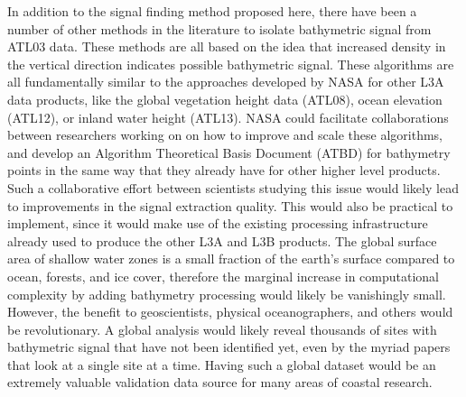 In addition to the signal finding method proposed here, there have been a number of other methods in the literature to isolate bathymetric signal from ATL03 data. These methods are all based on the idea that increased density in the vertical direction indicates possible bathymetric signal. These algorithms are all fundamentally similar to the approaches developed by NASA for other L3A data products, like the global vegetation height data (ATL08), ocean elevation (ATL12), or inland water height (ATL13). NASA could facilitate collaborations between researchers working on on how to improve and scale these algorithms, and develop an Algorithm Theoretical Basis Document (ATBD) for bathymetry points in the same way that they already have for other higher level products. Such a collaborative effort between scientists studying this issue would likely lead to improvements in the signal extraction quality. This would also be practical to implement, since it would make use of the existing processing infrastructure already used to produce the other L3A and L3B products. The global surface area of shallow water zones is a small fraction of the earth's surface compared to ocean, forests, and ice cover, therefore the marginal increase in computational complexity by adding bathymetry processing would likely be vanishingly small. However, the benefit to geoscientists, physical oceanographers, and others would be revolutionary. A global analysis would likely reveal thousands of sites with bathymetric signal that have not been identified yet, even by the myriad papers that look at a single site at a time. Having such a global dataset would be an extremely valuable validation data source for many areas of coastal research. 